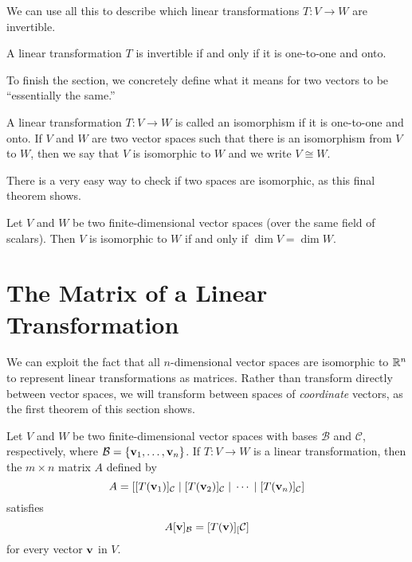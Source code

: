 \documentclass[../m073main.tex]{subfiles}
\begin{document}
We can use all this to describe which linear transformations $T : V \to W$ are invertible.

\begin{theorem}
	A linear transformation $T$ is invertible if and only if it is one-to-one and onto.
\end{theorem}

To finish the section, we concretely define what it means for two vectors to be ``essentially the same.''

\begin{definition}[Isomorphism]
	A linear transformation $T : V \to W$ is called an isomorphism if it is one-to-one and onto.
	If $V$ and $W$ are two vector spaces such that there is an isomorphism from $V$ to $W$, then we say that $V$ is isomorphic to $W$ and we write $V \cong W$.
\end{definition}

There is a very easy way to check if two spaces are isomorphic, as this final theorem shows.

\begin{theorem}
	Let $V$ and $W$ be two finite-dimensional vector spaces (over the same field of scalars).
	Then $V$ is isomorphic to $W$ if and only if $\dim V = \dim W$.
\end{theorem}

\section{The Matrix of a Linear Transformation}
We can exploit the fact that all $n$-dimensional vector spaces are isomorphic to $\mathbb{R}^n$ to represent linear transformations as matrices.
Rather than transform directly between vector spaces, we will transform between spaces of \textit{coordinate} vectors, as the first theorem of this section shows.

\begin{theorem}
	Let $V$ and $W$ be two finite-dimensional vector spaces with bases $\mathcal{B}$ and $\mathcal{C}$, respectively, where $\mathcal{B} = \{\mathbf{v}_1, \ldots, \mathbf{v}_n\}$.
	If $T : V \to W$ is a linear transformation, then the $m \times n$ matrix $A$ defined by
	\[ A = [ [T(\mathbf{v}_1)]_{\mathcal{C}} \;|\; [T(\mathbf{v}_2)]_{\mathcal{C}} \;|\; \cdots \;|\; [T(\mathbf{v}_n)]_{\mathcal{C}} ] \]
	satisfies
	\[ A [\mathbf{v}]_{\mathcal{B}} = [T(\mathbf{v})]_[\mathcal{C}] \]
	for every vector $\mathbf{v}$ in $V$.
\end{theorem}
\end{document}
